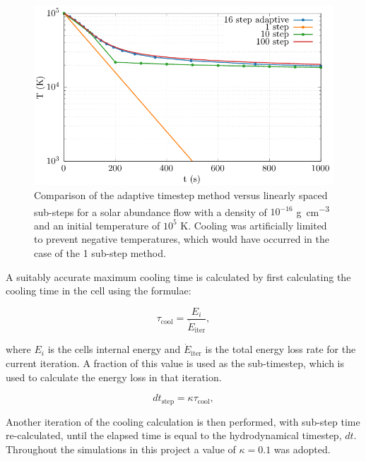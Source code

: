 \begin{figure}
  \centering
  \includegraphics{assets/plasma-cooling-benchmarks/evolution.pdf}
  \caption[Cooling sub-step method evolution comparison]{Comparison of the adaptive timestep method versus linearly spaced sub-steps for a solar abundance flow with a density of $10^{-16}$ \si{\gram\per\centi\metre\cubed} and an initial temperature of $10^5$ \si{\kelvin}. Cooling was artificially limited to prevent negative temperatures, which would have occurred in the case of the 1 sub-step method.}
  \label{fig:cooling-loop-evolution}
\end{figure}

A suitably accurate maximum cooling time is calculated by first calculating the cooling time in the cell using the formulae:

\begin{equation}
  \tau_\text{cool} = \frac{E_i}{\dot{E}_\text{iter}},
\end{equation}

\noindent
where $E_i$ is the cells internal energy and $\dot{E}_\text{iter}$ is the total energy loss rate for the current iteration.
A fraction of this value is used as the sub-timestep, which is used to calculate the energy loss in that iteration.

\begin{equation}
  dt_\text{step} = \kappa \tau_\text{cool}, \label{eq:kappafirstuse}
\end{equation}

\noindent
Another iteration of the cooling calculation is then performed, with sub-step time re-calculated, until the elapsed time is equal to the hydrodynamical timestep, $dt$. Throughout the simulations in this project a value of $\kappa = 0.1$ was adopted.


